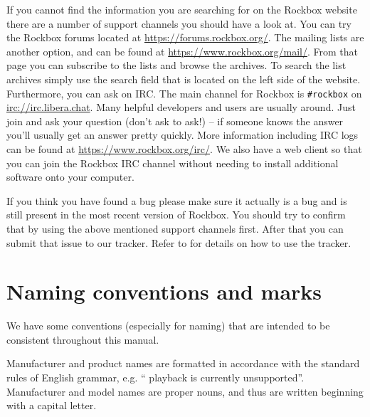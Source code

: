 If you cannot find the information you are searching for on the Rockbox
website there are a number of support channels you should have a look at.
You can try the Rockbox forums located at \url{https://forums.rockbox.org/}.
The mailing lists are another option, and can be found at
\url{https://www.rockbox.org/mail/}. From that page you can subscribe to the
lists and browse the archives. To search the list archives simply use
the search field that is located on the left side of the website.
Furthermore,  you can ask on IRC. The main channel for Rockbox is
\texttt{\#rockbox} on \url{irc://irc.libera.chat}. Many helpful developers
and users are usually around. Just join and ask your question (don't ask to
ask!) -- if someone knows the answer you'll
usually get an answer pretty quickly. More information including IRC logs
can be found at \url{https://www.rockbox.org/irc/}. We also have a web client
so that you can join the Rockbox IRC channel without needing
to install additional software onto your computer.

If you think you have found a bug please make sure it actually is a bug and is
still present in the most recent version of Rockbox. You should try to
confirm that by using the above mentioned support channels first. After that
you can submit that issue to our tracker. Refer to 
for details on how to use the tracker.


\section{Naming conventions and marks}
We have some conventions (especially for naming) that are intended to be
consistent throughout this manual.

Manufacturer and product names are formatted in accordance with the standard
rules of English grammar, e.g. ``\playerman{} playback is currently
unsupported''. Manufacturer and model names are proper nouns, and
thus are written beginning with a capital letter.

